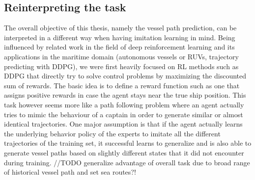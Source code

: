 \subsection{Reinterpreting the task} \label{subchap:reinterpreting}
The overall objective of this thesis, namely the vessel path prediction, can be interpreted in a different way when having imitation learning in mind. Being influenced by related work in the field of deep reinforcement learning and its applications in the maritime domain (autonomous vessels or RUVs, trajectory predicting with DDPG), we were first heavily focused on RL methods such as DDPG that directly try to solve control problems by maximizing the discounted sum of rewards. The basic idea is to define a reward function such as one that assigns positive rewards in case the agent stays near the true ship position. This task however seems more like a path following problem where an agent actually tries to mimic the behaviour of a captain in order to generate similar or almost identical trajectories. One major assumption is that if the agent actually learns the underlying behavior policy of the experts to imitate all the different trajectories of the training set, it successful learns to generalize and is also able to generate vessel paths based on slightly different states that it did not encounter during training.
//TODO generalize advantage of overall task due to broad range of historical vessel path and set sea routes?!
